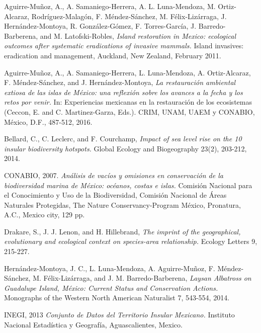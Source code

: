 \documentclass{article} %
\begin{document}
\begin{thebibliography}{10}

\hypertarget{aguirre}{}	 
Aguirre-Muñoz, A., A. Samaniego-Herrera, A. L. Luna-Mendoza, M. Ortiz-Alcaraz, Rodríguez-Malagón, F. Méndez-Sánchez, M. Félix-Lizárraga, J. Hernández-Montoya, R. González-Gómez, F. Torres-García, J. Barredo-Barberena, and M. Latofski-Robles, 
\textit{Island restoration in Mexico: ecological outcomes after systematic eradications of invasive mammals.} 
Island invasives: eradication and management, Auckland, New Zealand, February 2011.

\hypertarget{aguirre2}{}	 
Aguirre-Muñoz, A., A. Samaniego-Herrera, L. Luna-Mendoza, A. Ortiz-Alcaraz, F. Méndez-Sánchez, and J. Hernández-Montoya, 
\textit{La restauración ambiental extiosa de las islas de México: una reflexión sobre los avances a la fecha y los retos por venir.} 
In: Experiencias mexicanas en la restauración de los ecosistemas (Ceccon, E. and C. Martinez-Garza, Eds.). CRIM, UNAM, UAEM y CONABIO, México, D.F., 487-512, 2016.

\hypertarget{bellard}{}	 
Bellard, C., C. Leclerc, and F. Courchamp,
\textit{Impact of sea level rise on the 10 insular biodiversity hotspots.} 
Global Ecology and Biogeography 23(2), 203-212, 2014.

\hypertarget{conabio}{}	 
CONABIO, 2007.
\textit{Análisis de vacíos y omisiones en conservación de la biodiversidad marina de México: océanos, costas e islas.} 
Comisión Nacional para el
Conocimiento y Uso de la Biodiversidad, Comisión Nacional de Áreas Naturales Protegidas, The Nature Conservancy-Program México, Pronatura, A.C., Mexico city, 129 pp.
 
\hypertarget{drakare}{}	 
Drakare, S., J. J. Lenon, and H. Hillebrand,
\textit{The imprint of the geographical, evolutionary and ecological context on species-area relationship.} 
Ecology Letters 9, 215-227.

\hypertarget{hernandez}{}	 
Hernández-Montoya, J. C., L. Luna-Mendoza, A. Aguirre-Muñoz, F. Méndez-Sánchez, M. Félix-Lizárraga, and J. M. Barredo-Barberena,
\textit{Laysan Albatross on Guadalupe Island, México: Current Status and Conservation Actions.} 
Monographs of the Western North American Naturalist 7, 543-554, 2014.

\hypertarget{inegi}{}	 
INEGI, 2013
\textit{Conjunto de Datos del Territorio Insular Mexicano.} 
Instituto Nacional Estadística y Geografía, Aguascalientes, Mexico.


\end{thebibliography}
\end{document}
